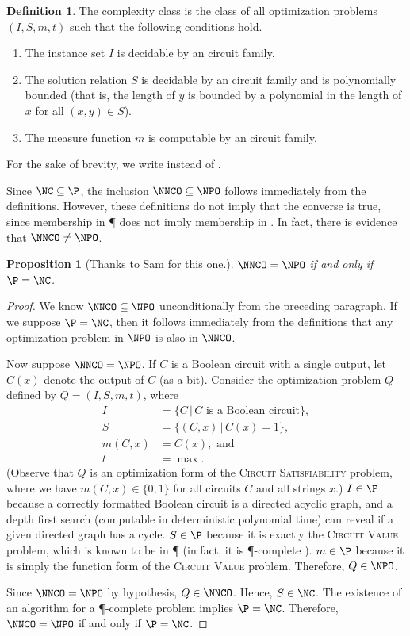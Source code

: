 \documentclass[]{article}
\theoremstyle{plain}
\newtheorem{proposition}{Proposition}
\theoremstyle{definition}
\newtheorem{definition}{Definition}
\begin{document}
\begin{definition}\label{def:nnco}
  The complexity class \NNCOpoly{} is the class of all optimization problems $(I, S, m, t)$ such that the following conditions hold.
  \begin{enumerate}
  \item The instance set $I$ is decidable by an \NC{} circuit family.
  \item The solution relation $S$ is decidable by an \NC{} circuit family and is polynomially bounded (that is, the length of $y$ is bounded by a polynomial in the length of $x$ for all $(x, y)\in S$).
  \item The measure function $m$ is computable by an \FNC{} circuit family.
  \end{enumerate}
  For the sake of brevity, we write \NNCO{} instead of \NNCOpoly{}.
\end{definition}

Since $\NC\subseteq\P$, the inclusion $\NNCO\subseteq\NPO$ follows immediately from the definitions.
However, these definitions do not imply that the converse is true, since membership in \P{} does not imply membership in \NC.
In fact, there is evidence that $\NNCO \neq \NPO$.
\begin{proposition}[Thanks to Sam for this one.]
  $\NNCO = \NPO$ if and only if $\P = \NC$.
\end{proposition}
\begin{proof}
  We know $\NNCO \subseteq \NPO$ unconditionally from the preceding paragraph.
  If we suppose $\P = \NC$, then it follows immediately from the definitions that any optimization problem in $\NPO$ is also in $\NNCO$.

  Now suppose $\NNCO = \NPO$.
  If $C$ is a Boolean circuit with a single output, let $C(x)$ denote the output of $C$ (as a bit).
  Consider the optimization problem $Q$ defined by $Q = (I, S, m, t)$, where
  \begin{align*}
    I & = \{ C \, | \, C \text{ is a Boolean circuit} \}, \\
    S & = \{ (C, x) \, | \, C(x) = 1 \}, \\
    m(C, x) & = C(x), \text{ and} \\
    t & = \max.
  \end{align*}
  (Observe that $Q$ is an optimization form of the \textsc{Circuit Satisfiability} problem, where we have $m(C, x) \in \{0, 1\}$ for all circuits $C$ and all strings $x$.)
  $I \in \P$ because a correctly formatted Boolean circuit is a directed acyclic graph, and a depth first search (computable in deterministic polynomial time) can reveal if a given directed graph has a cycle.
  $S \in \P$ because it is exactly the \textsc{Circuit Value} problem, which is known to be in \P{} (in fact, it is \P-complete \cite[Problem~A.1.1]{ghr95}).
  $m \in \P$ because it is simply the function form of the \textsc{Circuit Value} problem.
  Therefore, $Q \in \NPO$.

  Since $\NNCO = \NPO$ by hypothesis, $Q \in \NNCO$.
  Hence, $S \in \NC$.
  The existence of an \NC{} algorithm for a \P-complete problem implies $\P = \NC$.
  Therefore, $\NNCO = \NPO$ if and only if $\P = \NC$.
\end{proof}
\end{document}
